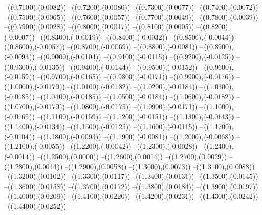{	--({\sx*(0.7100)},{\sy*(0.0082)})
	--({\sx*(0.7200)},{\sy*(0.0080)})
	--({\sx*(0.7300)},{\sy*(0.0077)})
	--({\sx*(0.7400)},{\sy*(0.0072)})
	--({\sx*(0.7500)},{\sy*(0.0065)})
	--({\sx*(0.7600)},{\sy*(0.0057)})
	--({\sx*(0.7700)},{\sy*(0.0049)})
	--({\sx*(0.7800)},{\sy*(0.0039)})
	--({\sx*(0.7900)},{\sy*(0.0028)})
	--({\sx*(0.8000)},{\sy*(0.0017)})
	--({\sx*(0.8100)},{\sy*(0.0005)})
	--({\sx*(0.8200)},{\sy*(-0.0007)})
	--({\sx*(0.8300)},{\sy*(-0.0019)})
	--({\sx*(0.8400)},{\sy*(-0.0032)})
	--({\sx*(0.8500)},{\sy*(-0.0044)})
	--({\sx*(0.8600)},{\sy*(-0.0057)})
	--({\sx*(0.8700)},{\sy*(-0.0069)})
	--({\sx*(0.8800)},{\sy*(-0.0081)})
	--({\sx*(0.8900)},{\sy*(-0.0093)})
	--({\sx*(0.9000)},{\sy*(-0.0104)})
	--({\sx*(0.9100)},{\sy*(-0.0115)})
	--({\sx*(0.9200)},{\sy*(-0.0125)})
	--({\sx*(0.9300)},{\sy*(-0.0135)})
	--({\sx*(0.9400)},{\sy*(-0.0144)})
	--({\sx*(0.9500)},{\sy*(-0.0152)})
	--({\sx*(0.9600)},{\sy*(-0.0159)})
	--({\sx*(0.9700)},{\sy*(-0.0165)})
	--({\sx*(0.9800)},{\sy*(-0.0171)})
	--({\sx*(0.9900)},{\sy*(-0.0176)})
	--({\sx*(1.0000)},{\sy*(-0.0179)})
	--({\sx*(1.0100)},{\sy*(-0.0182)})
	--({\sx*(1.0200)},{\sy*(-0.0184)})
	--({\sx*(1.0300)},{\sy*(-0.0185)})
	--({\sx*(1.0400)},{\sy*(-0.0185)})
	--({\sx*(1.0500)},{\sy*(-0.0184)})
	--({\sx*(1.0600)},{\sy*(-0.0182)})
	--({\sx*(1.0700)},{\sy*(-0.0179)})
	--({\sx*(1.0800)},{\sy*(-0.0175)})
	--({\sx*(1.0900)},{\sy*(-0.0171)})
	--({\sx*(1.1000)},{\sy*(-0.0165)})
	--({\sx*(1.1100)},{\sy*(-0.0159)})
	--({\sx*(1.1200)},{\sy*(-0.0151)})
	--({\sx*(1.1300)},{\sy*(-0.0143)})
	--({\sx*(1.1400)},{\sy*(-0.0134)})
	--({\sx*(1.1500)},{\sy*(-0.0125)})
	--({\sx*(1.1600)},{\sy*(-0.0115)})
	--({\sx*(1.1700)},{\sy*(-0.0104)})
	--({\sx*(1.1800)},{\sy*(-0.0093)})
	--({\sx*(1.1900)},{\sy*(-0.0081)})
	--({\sx*(1.2000)},{\sy*(-0.0068)})
	--({\sx*(1.2100)},{\sy*(-0.0055)})
	--({\sx*(1.2200)},{\sy*(-0.0042)})
	--({\sx*(1.2300)},{\sy*(-0.0028)})
	--({\sx*(1.2400)},{\sy*(-0.0014)})
	--({\sx*(1.2500)},{\sy*(0.0000)})
	--({\sx*(1.2600)},{\sy*(0.0014)})
	--({\sx*(1.2700)},{\sy*(0.0029)})
	--({\sx*(1.2800)},{\sy*(0.0044)})
	--({\sx*(1.2900)},{\sy*(0.0058)})
	--({\sx*(1.3000)},{\sy*(0.0073)})
	--({\sx*(1.3100)},{\sy*(0.0088)})
	--({\sx*(1.3200)},{\sy*(0.0102)})
	--({\sx*(1.3300)},{\sy*(0.0117)})
	--({\sx*(1.3400)},{\sy*(0.0131)})
	--({\sx*(1.3500)},{\sy*(0.0145)})
	--({\sx*(1.3600)},{\sy*(0.0158)})
	--({\sx*(1.3700)},{\sy*(0.0172)})
	--({\sx*(1.3800)},{\sy*(0.0184)})
	--({\sx*(1.3900)},{\sy*(0.0197)})
	--({\sx*(1.4000)},{\sy*(0.0209)})
	--({\sx*(1.4100)},{\sy*(0.0220)})
	--({\sx*(1.4200)},{\sy*(0.0231)})
	--({\sx*(1.4300)},{\sy*(0.0242)})
	--({\sx*(1.4400)},{\sy*(0.0252)})
}
